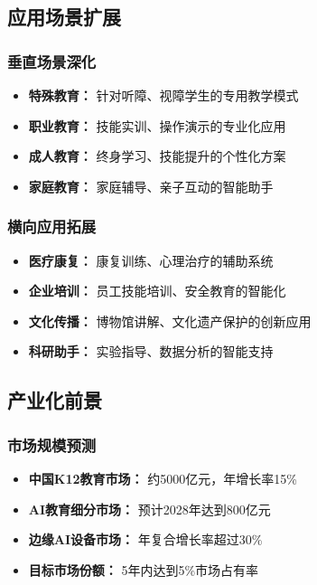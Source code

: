 \documentclass[12pt,a4paper]{article}
\begin{document}
\subsection{应用场景扩展}

\subsubsection{垂直场景深化}
\begin{itemize}[leftmargin=2em]
    \item \textbf{特殊教育：} 针对听障、视障学生的专用教学模式
    \item \textbf{职业教育：} 技能实训、操作演示的专业化应用
    \item \textbf{成人教育：} 终身学习、技能提升的个性化方案
    \item \textbf{家庭教育：} 家庭辅导、亲子互动的智能助手
\end{itemize}

\subsubsection{横向应用拓展}
\begin{itemize}[leftmargin=2em]
    \item \textbf{医疗康复：} 康复训练、心理治疗的辅助系统
    \item \textbf{企业培训：} 员工技能培训、安全教育的智能化
    \item \textbf{文化传播：} 博物馆讲解、文化遗产保护的创新应用
    \item \textbf{科研助手：} 实验指导、数据分析的智能支持
\end{itemize}

\subsection{产业化前景}

\subsubsection{市场规模预测}
\begin{itemize}[leftmargin=2em]
    \item \textbf{中国K12教育市场：} 约5000亿元，年增长率15\%
    \item \textbf{AI教育细分市场：} 预计2028年达到800亿元
    \item \textbf{边缘AI设备市场：} 年复合增长率超过30\%
    \item \textbf{目标市场份额：} 5年内达到5\%市场占有率
\end{itemize}
\end{document}
